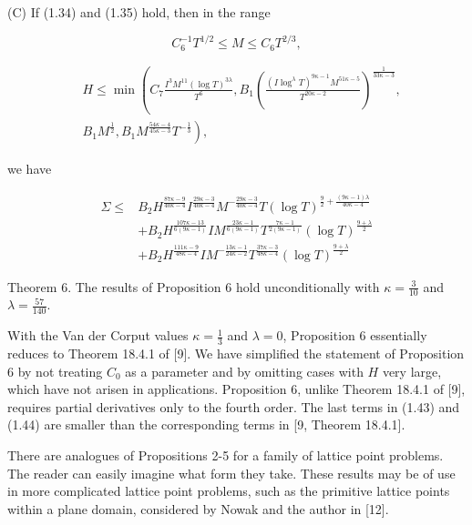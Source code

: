 \documentclass[10pt]{article}
\begin{document}
(C) If (1.34) and (1.35) hold, then in the range


\begin{equation*}
C_{6}^{-1} T^{1 / 2} \leqslant M \leqslant C_{6} T^{2 / 3}, \tag{1.42}
\end{equation*}



\begin{align*}
& H \leqslant \min \left(C_{7} \frac{I^{3} M^{11}(\log T)^{3 \lambda}}{T^{6}}, B_{1}\left(\frac{\left(I \log ^{\lambda} T\right)^{9 \kappa-1} M^{51 \kappa-5}}{T^{20 \kappa-2}}\right)^{\frac{1}{33 \kappa-3}},\right. \\
&\left.B_{1} M^{\frac{1}{2}}, B_{1} M^{\frac{54 \kappa-4}{45 \kappa-3}} T^{-\frac{1}{3}}\right), \tag{1.43}
\end{align*}


we have


\begin{align*}
\Sigma \leqslant & B_{2} H^{\frac{87 \kappa-9}{40 \kappa-4}} I^{\frac{29 \kappa-3}{40 \kappa-4}} M^{-\frac{29 \kappa-3}{40 \kappa-4}} T(\log T)^{\frac{9}{2}+\frac{(9 \kappa-1)\lambda}{40 \kappa-4}} \\
& +B_{2} H^{\frac{107 \kappa-13}{6(9 \kappa-1)}} I M^{\frac{23 \kappa-1}{6(9 \kappa-1)}} T^{\frac{7 \kappa-1}{2(9 \kappa-1)}}(\log T)^{\frac{9+\lambda}{2}} \\
& +B_{2} H^{\frac{111 \kappa-9}{48 \kappa-4}} I M^{-\frac{13 \kappa-1}{24 \kappa-2}} T^{\frac{37 \kappa-3}{48 \kappa-4}}(\log T)^{\frac{9+\lambda}{2}} \tag{1.44}
\end{align*}


Theorem 6. The results of Proposition 6 hold unconditionally with $\kappa=\frac{3}{10}$ and $\lambda=\frac{57}{140}$.

With the Van der Corput values $\kappa=\frac{1}{3}$ and $\lambda=0$, Proposition 6 essentially reduces to Theorem 18.4.1 of [9]. We have simplified the statement of Proposition 6 by not treating $C_{0}$ as a parameter and by omitting cases with $H$ very large, which have not arisen in applications. Proposition 6, unlike Theorem 18.4.1 of [9], requires partial derivatives only to the fourth order. The last terms in (1.43) and (1.44) are smaller than the corresponding terms in [9, Theorem 18.4.1].

There are analogues of Propositions 2-5 for a family of lattice point problems. The reader can easily imagine what form they take. These results may be of use in more complicated lattice point problems, such as the primitive lattice points within a plane domain, considered by Nowak and the author in [12].
\end{document}
